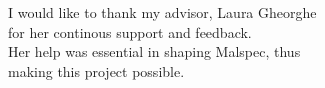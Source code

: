 \vspace*{7cm}
\begin{center}
I would like to thank my advisor, Laura Gheorghe\\
for her continous support and feedback.\\
Her help was essential in shaping Malspec, thus \\
making this project possible.
\end{center}
